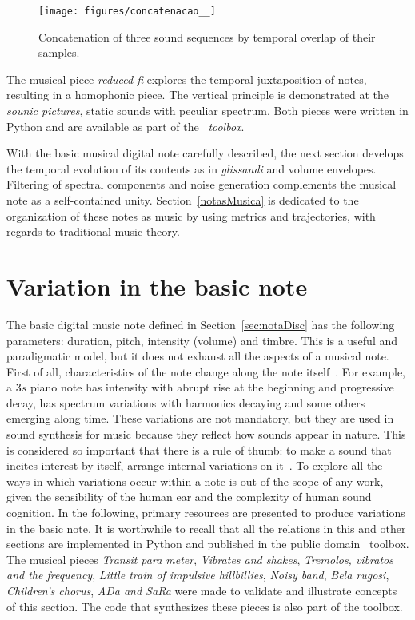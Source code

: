 \begin{figure}[h!]
{    \centering
        \texttt{[image: figures/concatenacao\_\_]}}
    \caption{Concatenation of three sound sequences by temporal overlap of their samples.}
        \label{fig:concatenacao}
\end{figure}

The musical piece \emph{reduced-fi} explores the temporal juxtaposition of notes, resulting in a homophonic piece. The vertical principle is demonstrated at the \emph{sounic pictures}, static sounds with peculiar spectrum. Both pieces were written in Python and are available as part of the \massa\ \emph{toolbox}.\cite{MASSA}

With the basic musical digital note carefully described, the next section develops the temporal evolution of its contents as in \emph{glissandi} and volume envelopes. Filtering of spectral components and noise generation complements the musical note as a self-contained unity. Section~\ref{notasMusica} is dedicated to the organization of these notes as music by using metrics and trajectories, with regards to traditional music theory.



\section{Variation in the basic note}\label{sec:internalVar}\label{sec:varInternas}
The basic digital music note defined in Section~\ref{sec:notaDisc} has the following parameters: duration, pitch, intensity (volume) and timbre. This is a useful and paradigmatic model, but it does not exhaust all the aspects of a musical note. First of all, characteristics of the note change along the note itself~\cite{Chowning}. For example, a $3s$ piano note has intensity with abrupt rise at the beginning and progressive decay, has spectrum variations with harmonics decaying and some others emerging along time. These variations are not mandatory, but they are used in sound synthesis for music because they reflect how sounds appear in nature. This is considered so important that there is a rule of thumb: to make a sound that incites interest by itself, arrange internal variations on it~\cite{Roederer}.
To explore all the ways in which variations occur within a note is out of the scope of any work, given the sensibility of the human ear and the complexity of human sound cognition. In the following, primary resources are presented to produce variations in the basic note. It is worthwhile to recall that all the relations in this and other sections are implemented in Python and published in the public domain \massa\ toolbox. The musical pieces \emph{Transit para meter}, \emph{Vibrates and shakes}, \emph{Tremolos, vibratos and the frequency}, \emph{Little train of impulsive hillbillies}, \emph{Noisy band}, \emph{Bela rugosi}, \emph{Children's chorus}, \emph{ADa and SaRa} were made to validate and illustrate concepts of this section. The code that synthesizes these pieces is also part of the toolbox\cite{MASSA}.
 
